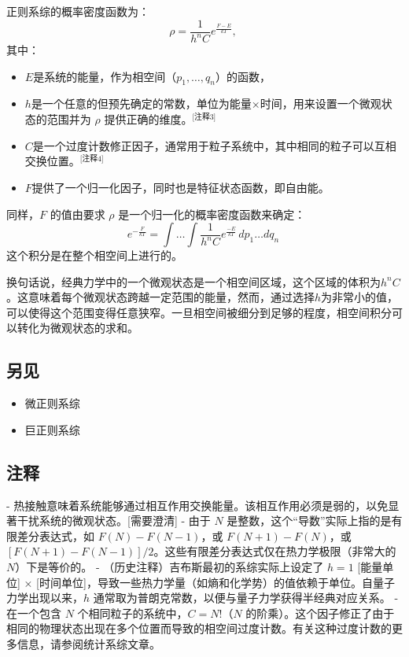 正则系综的概率密度函数为：
\[
\rho = \frac{1}{h^n C} e^{\frac{F - E}{kT}},~
\]
其中：
\begin{itemize}
\item \( E \)是系统的能量，作为相空间（\( p_1, \dots, q_n \)）的函数，
\item \( h \)是一个任意的但预先确定的常数，单位为能量×时间，用来设置一个微观状态的范围并为 \( \rho \) 提供正确的维度。\(^\text{[注释3]}\)
\item \( C \)是一个过度计数修正因子，通常用于粒子系统中，其中相同的粒子可以互相交换位置。\(^\text{[注释4]}\)
\item \( F \)提供了一个归一化因子，同时也是特征状态函数，即自由能。
\end{itemize}
同样，\( F \) 的值由要求 \( \rho \) 是一个归一化的概率密度函数来确定：
\[
e^{- \frac{F}{kT}} = \int \ldots \int \frac{1}{h^n C} e^{\frac{-E}{kT}} \, dp_1 \ldots dq_n~
\]
这个积分是在整个相空间上进行的。

换句话说，经典力学中的一个微观状态是一个相空间区域，这个区域的体积为\( h^n C \)。这意味着每个微观状态跨越一定范围的能量，然而，通过选择\( h \)为非常小的值，可以使得这个范围变得任意狭窄。一旦相空间被细分到足够的程度，相空间积分可以转化为微观状态的求和。
\subsection{另见}  
\begin{itemize}
\item 微正则系综  
\item 巨正则系综
\end{itemize}  
\subsection{注释 } 
- 热接触意味着系统能够通过相互作用交换能量。该相互作用必须是弱的，以免显著干扰系统的微观状态。[需要澄清]
- 由于 \( N \) 是整数，这个“导数”实际上指的是有限差分表达式，如 \( F(N) - F(N - 1) \)，或 \( F(N + 1) - F(N) \)，或 \( [F(N + 1) - F(N - 1)] / 2 \)。这些有限差分表达式仅在热力学极限（非常大的 \( N \)）下是等价的。
- （历史注释）吉布斯最初的系综实际上设定了 \( h = 1 \) [能量单位] × [时间单位]，导致一些热力学量（如熵和化学势）的值依赖于单位。自量子力学出现以来，\( h \) 通常取为普朗克常数，以便与量子力学获得半经典对应关系。
- 在一个包含 \( N \) 个相同粒子的系统中，\( C = N! \)（\( N \) 的阶乘）。这个因子修正了由于相同的物理状态出现在多个位置而导致的相空间过度计数。有关这种过度计数的更多信息，请参阅统计系综文章。